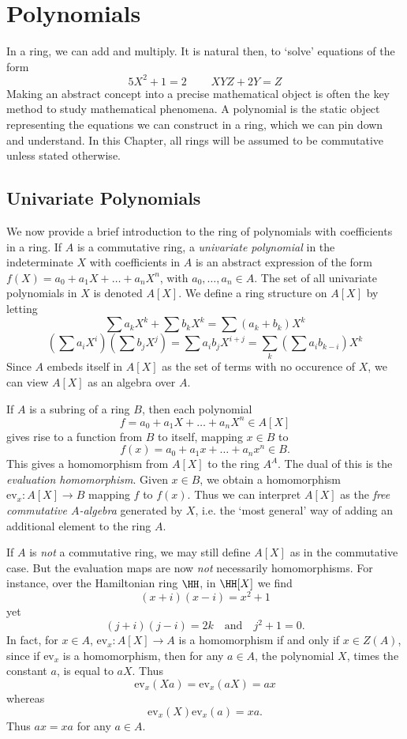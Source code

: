 \chapter{Polynomials}

In a ring, we can add and multiply. It is natural then, to `solve' equations of the form
%
\[ 5 X^2 + 1 = 2\ \ \ \ \ \ \ \ \ \ XYZ + 2Y = Z \]
%
Making an abstract concept into a precise mathematical object is often the key method to study mathematical phenomena. A polynomial is the static object representing the equations we can construct in a ring, which we can pin down and understand. In this Chapter, all rings will be assumed to be commutative unless stated otherwise.

\section{Univariate Polynomials}

We now provide a brief introduction to the ring of polynomials with coefficients in a ring. If $A$ is a commutative ring, a {\it univariate polynomial} in the indeterminate $X$ with coefficients in $A$ is an abstract expression of the form $f(X) = a_0 + a_1 X + \dots + a_n X^n$, with $a_0,\dots,a_n \in A$. The set of all univariate polynomials in $X$ is denoted $A[X]$. We define a ring structure on $A[X]$ by letting
%
\[ \sum a_k X^k + \sum b_k X^k = \sum (a_k + b_k) X^k \]
%
\[ \left( \sum a_i X^i \right) \left( \sum b_j X^j \right) = \sum a_i b_j X^{i + j} = \sum_k \left( \sum a_i b_{k - i} \right) X^k \]
%
Since $A$ embeds itself in $A[X]$ as the set of terms with no occurence of $X$, we can view $A[X]$ as an algebra over $A$.

If $A$ is a subring of a ring $B$, then each polynomial
%
\[ f = a_0 + a_1 X + \dots + a_n X^n \in A[X] \]
%
gives rise to a function from $B$ to itself, mapping $x \in B$ to
%
\[ f(x) = a_0 + a_1x + \dots + a_nx^n \in B. \]
%
This gives a homomorphism from $A[X]$ to the ring $A^A$. The dual of this is the \emph{evaluation homomorphism}. Given $x \in B$, we obtain a homomorphism $\text{ev}_x: A[X] \to B$ mapping $f$ to $f(x)$. Thus we can interpret $A[X]$ as the {\it free commutative $A$-algebra} generated by $X$, i.e. the `most general' way of adding an additional element to the ring $A$.

\begin{remark}
    If $A$ is \emph{not} a commutative ring, we may still define $A[X]$ as in the commutative case. But the evaluation maps are now \emph{not} necessarily homomorphisms. For instance, over the Hamiltonian ring $\HH$, in $\HH[X]$ we find
    \[ (x + i)(x - i) = x^2 + 1 \]
    yet
    \[ (j + i)(j - i) = 2k \quad\text{and}\quad j^2 + 1 = 0. \]
    In fact, for $x \in A$, $\text{ev}_x: A[X] \to A$ is a homomorphism if and only if $x \in Z(A)$, since if $\text{ev}_x$ is a homomorphism, then for any $a \in A$, the polynomial $X$, times the constant $a$, is equal to $aX$. Thus
    \[ \text{ev}_x(Xa) = \text{ev}_x(aX) = ax \]
    whereas
    \[ \text{ev}_x(X) \text{ev}_x(a) = xa. \]
    Thus $ax = xa$ for any $a \in A$.
\end{remark}

